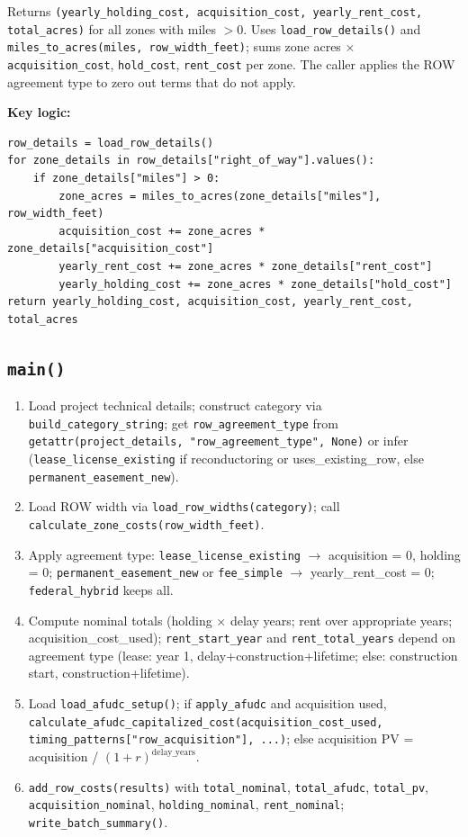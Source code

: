 \documentclass[ctcc_full_documentation.tex]{subfiles}
\begin{document}
Returns \texttt{(yearly\_holding\_cost, acquisition\_cost, yearly\_rent\_cost, total\_acres)} for all zones with miles $> 0$. Uses \texttt{load\_row\_details()} and \texttt{miles\_to\_acres(miles, row\_width\_feet)}; sums zone acres $\times$ \texttt{acquisition\_cost}, \texttt{hold\_cost}, \texttt{rent\_cost} per zone. The caller applies the ROW agreement type to zero out terms that do not apply.

\textbf{Key logic:}
\begin{lstlisting}
row_details = load_row_details()
for zone_details in row_details["right_of_way"].values():
    if zone_details["miles"] > 0:
        zone_acres = miles_to_acres(zone_details["miles"], row_width_feet)
        acquisition_cost += zone_acres * zone_details["acquisition_cost"]
        yearly_rent_cost += zone_acres * zone_details["rent_cost"]
        yearly_holding_cost += zone_acres * zone_details["hold_cost"]
return yearly_holding_cost, acquisition_cost, yearly_rent_cost, total_acres
\end{lstlisting}

\subsection{\texttt{main()}}

\begin{enumerate}
    \item Load project technical details; construct category via \texttt{build\_category\_string}; get \texttt{row\_agreement\_type} from \texttt{getattr(project\_details, "row\_agreement\_type", None)} or infer (\texttt{lease\_license\_existing} if reconductoring or uses\_existing\_row, else \texttt{permanent\_easement\_new}).
    \item Load ROW width via \texttt{load\_row\_widths(category)}; call \texttt{calculate\_zone\_costs(row\_width\_feet)}.
    \item Apply agreement type: \texttt{lease\_license\_existing} $\to$ acquisition = 0, holding = 0; \texttt{permanent\_easement\_new} or \texttt{fee\_simple} $\to$ yearly\_rent\_cost = 0; \texttt{federal\_hybrid} keeps all.
    \item Compute nominal totals (holding $\times$ delay years; rent over appropriate years; acquisition\_cost\_used); \texttt{rent\_start\_year} and \texttt{rent\_total\_years} depend on agreement type (lease: year 1, delay+construction+lifetime; else: construction start, construction+lifetime).
    \item Load \texttt{load\_afudc\_setup()}; if \texttt{apply\_afudc} and acquisition used, \texttt{calculate\_afudc\_capitalized\_cost(acquisition\_cost\_used, timing\_patterns["row\_acquisition"], ...)}; else acquisition PV = acquisition / $(1+r)^{\mathrm{delay\_years}}$.
    \item \texttt{add\_row\_costs(results)} with \texttt{total\_nominal}, \texttt{total\_afudc}, \texttt{total\_pv}, \texttt{acquisition\_nominal}, \texttt{holding\_nominal}, \texttt{rent\_nominal}; \texttt{write\_batch\_summary()}.
\end{enumerate}
\end{document}

